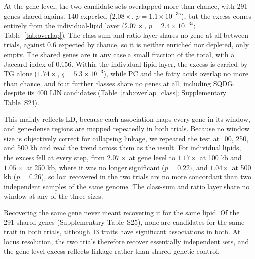 \documentclass[9pt,twocolumn,twoside]{rilabRxiv}
\begin{document}
At the gene level, the two candidate sets overlapped more than chance, with 291 genes shared against 140 expected ($2.08\times$, $p = 1.1\times10^{-35}$), but the excess comes entirely from the individual-lipid layer ($2.07\times$, $p = 2.4\times10^{-34}$; Table~\ref{tab:overlap}). The class-sum and ratio layer shares no gene at all between trials, against 0.6 expected by chance, so it is neither enriched nor depleted, only empty. The shared genes are in any case a small fraction of the total, with a Jaccard index of 0.056. Within the individual-lipid layer, the excess is carried by TG alone ($1.74\times$, $q = 5.3\times10^{-3}$), while PC and the fatty acids overlap no more than chance, and four further classes share no genes at all, including SQDG, despite its 400 LIN candidates (Table~\ref{tab:overlap_class}; Supplementary Table~S24).

This mainly reflects LD, because each association maps every gene in its window, and gene-dense regions are mapped repeatedly in both trials. Because no window size is objectively correct for collapsing linkage, we repeated the test at 100, 250, and 500 kb and read the trend across them as the result. For individual lipids, the excess fell at every step, from $2.07\times$ at gene level to $1.17\times$ at 100 kb and $1.05\times$ at 250 kb, where it was no longer significant ($p = 0.22$), and $1.04\times$ at 500 kb ($p = 0.26$), so loci recovered in the two trials are no more concordant than two independent samples of the same genome. The class-sum and ratio layer share no window at any of the three sizes.

Recovering the same gene never meant recovering it for the same lipid. Of the 291 shared genes (Supplementary Table~S25), none are candidates for the same trait in both trials, although 13 traits have significant associations in both. At locus resolution, the two trials therefore recover essentially independent sets, and the gene-level excess reflects linkage rather than shared genetic control.
\end{document}
